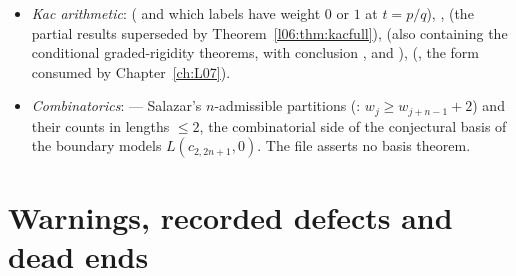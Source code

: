 \begin{itemize}
  polynomial certificate relating $p$ and $p+4$; the docstring states that the needed nonvanishing is neither
  assumed nor proved there; no headline theorem of this chapter depends on these files).
\item \emph{Kac arithmetic}:  ( and which labels have
  weight $0$ or $1$ at $t = p/q$), , 
  (the partial results superseded by Theorem~\ref{l06:thm:kacfull}), 
  (also containing the conditional graded-rigidity theorems, with conclusion , \allowbreak{}\allowbreak{}\allowbreak{}\allowbreak{}\allowbreak{} and
  \allowbreak{}\allowbreak{}\allowbreak{}\allowbreak{}\allowbreak{}), 
  (\allowbreak{}\allowbreak{}\allowbreak{}\allowbreak{}\allowbreak{}, the form consumed by Chapter~\ref{ch:L07}).
\item \emph{Combinatorics}:  --- Salazar's $n$-admissible partitions
  (: $w_j\ge w_{j+n-1}+2$) and their counts in lengths $\le2$, the combinatorial side of
  the conjectural basis of the boundary models $L(c_{2,2n+1},0)$. The file asserts no basis theorem.
\end{itemize}
\par\endgroup

\section{Warnings, recorded defects and dead ends}\label{l06:sec:warnings}

